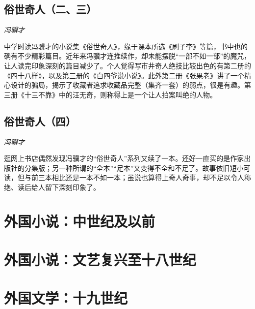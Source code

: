 \subsection*{俗世奇人（二、三）}
\par \emph{冯骥才} 
\par 中学时读冯骥才的小说集《俗世奇人》，缘于课本所选《刷子李》等篇，书中也的确有不少精彩篇目。近年来冯骥才连推续作，却未能摆脱“一部不如一部”的魔咒，让人读完印象深刻的篇目减少了。个人觉得写市井奇人绝技比较出色的有第二册的《四十八样》，以及第三册的《白四爷说小说》。此外第二册《张果老》讲了一个精心设计的骗局，揭示了收藏者追求收藏品完整（集齐一套）的弱点，很是有趣。第三册《十三不靠》中的汪无奇，则称得上是一个让人拍案叫绝的人物。
\par {}

\subsection*{俗世奇人（四）}
\par \emph{冯骥才} 

\par 逛网上书店偶然发现冯骥才的“俗世奇人”系列又续了一本。还好一直买的是作家出版社的分集版；另一种所谓的“全本”“足本”又变得不全和不足了。故事依旧短小可读，但与前三本相比还是一本不如一本；虽说也算得上奇人奇事，却不足以令人称绝、读后给人留下深刻印象了。
\par {}


\section{外国小说：中世纪及以前}

\section{外国小说：文艺复兴至十八世纪}

\section{外国文学：十九世纪}

